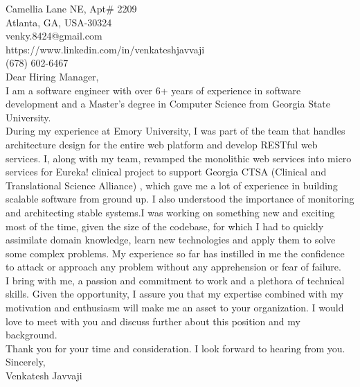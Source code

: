 \documentclass[10pt,letterpaper,oneside]{article}
\begin{document}
 Camellia Lane NE, Apt\# 2209\\
Atlanta, GA, USA-30324\\
venky.8424@gmail.com\\
https://www.linkedin.com/in/venkateshjavvaji\\
(678) 602-6467\\
 
\noindent Dear Hiring Manager,\\
 
I am a software engineer with over 6+ years of experience in software development and a Master's degree in Computer Science from Georgia State University.\\

During my experience at Emory University, I was part of the team that handles architecture design for the entire web platform and develop RESTful web services. I, along with my team, revamped the monolithic web services into micro services for Eureka! clinical project to support Georgia CTSA (Clinical and Translational Science Alliance) , which gave me a lot of experience in building scalable software from ground up. I also understood the importance of monitoring and architecting stable systems.I was working on something new and exciting most of the time, given the size of the codebase, for which I had to quickly assimilate domain knowledge, learn new technologies and apply them to solve some complex problems. My  experience so far has instilled in me the confidence to attack or approach any problem without any apprehension or fear of failure.\\
 
I bring with me, a passion and commitment to work and a plethora of technical skills. Given the opportunity, I assure you that my expertise combined with my motivation and enthusiasm will make me an asset to your organization. I would love to meet with you and discuss further about this position and my background.\\

Thank you for your time and consideration. I look forward to hearing from you.\\
 
\noindent Sincerely,\\
Venkatesh Javvaji\\
\end{document}
